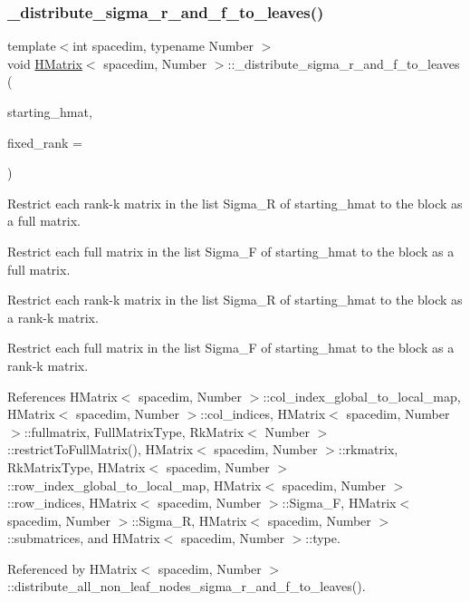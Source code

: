 \subsubsection{\texorpdfstring{\+\_\+distribute\+\_\+sigma\+\_\+r\+\_\+and\+\_\+f\+\_\+to\+\_\+leaves()}{\_distribute\_sigma\_r\_and\_f\_to\_leaves()}}
{\footnotesize\ttfamily template$<$int spacedim, typename Number $>$ \\
void \hyperlink{classHMatrix}{H\+Matrix}$<$ spacedim, Number $>$\+::\+\_\+distribute\+\_\+sigma\+\_\+r\+\_\+and\+\_\+f\+\_\+to\+\_\+leaves (\begin{DoxyParamCaption}\item[{\hyperlink{classHMatrix}{H\+Matrix}$<$ spacedim, Number $>$ \&}]{starting\+\_\+hmat,  }\item[{const unsigned int}]{fixed\+\_\+rank = {} }\end{DoxyParamCaption})\hspace{0.3cm}{\ttfamily [private]}}

Restrict each rank-\/k matrix in the list {\ttfamily Sigma\+\_\+R} of {\ttfamily starting\+\_\+hmat} to the block as a full matrix.

Restrict each full matrix in the list {\ttfamily Sigma\+\_\+F} of {\ttfamily starting\+\_\+hmat} to the block as a full matrix.

Restrict each rank-\/k matrix in the list {\ttfamily Sigma\+\_\+R} of {\ttfamily starting\+\_\+hmat} to the block as a rank-\/k matrix.

Restrict each full matrix in the list {\ttfamily Sigma\+\_\+F} of {\ttfamily starting\+\_\+hmat} to the block as a rank-\/k matrix.

References H\+Matrix$<$ spacedim, Number $>$\+::col\+\_\+index\+\_\+global\+\_\+to\+\_\+local\+\_\+map, H\+Matrix$<$ spacedim, Number $>$\+::col\+\_\+indices, H\+Matrix$<$ spacedim, Number $>$\+::fullmatrix, Full\+Matrix\+Type, Rk\+Matrix$<$ Number $>$\+::restrict\+To\+Full\+Matrix(), H\+Matrix$<$ spacedim, Number $>$\+::rkmatrix, Rk\+Matrix\+Type, H\+Matrix$<$ spacedim, Number $>$\+::row\+\_\+index\+\_\+global\+\_\+to\+\_\+local\+\_\+map, H\+Matrix$<$ spacedim, Number $>$\+::row\+\_\+indices, H\+Matrix$<$ spacedim, Number $>$\+::\+Sigma\+\_\+F, H\+Matrix$<$ spacedim, Number $>$\+::\+Sigma\+\_\+R, H\+Matrix$<$ spacedim, Number $>$\+::submatrices, and H\+Matrix$<$ spacedim, Number $>$\+::type.



Referenced by H\+Matrix$<$ spacedim, Number $>$\+::distribute\+\_\+all\+\_\+non\+\_\+leaf\+\_\+nodes\+\_\+sigma\+\_\+r\+\_\+and\+\_\+f\+\_\+to\+\_\+leaves().

